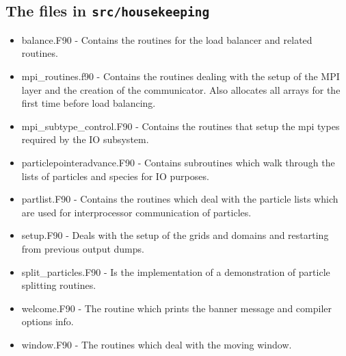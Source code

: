 \documentclass[12pt]{article}
\newcommand{\inlinecode}[1]{{\color{warwickred} \bf\texttt{#1}}}
\begin{document}
\subsection{The files in \inlinecode{src/housekeeping}}
\begin{itemize}
\item balance.F90 - Contains the routines for the load balancer and related
  routines.
\item mpi\_routines.f90 - Contains the routines dealing with the setup of the
  MPI layer and the creation of the communicator. Also allocates all arrays
  for the first time before load balancing.
\item mpi\_subtype\_control.F90 - Contains the routines that setup the mpi
  types required by the IO subsystem.
\item particlepointeradvance.F90 - Contains subroutines which walk through the
  lists of particles and species for IO purposes.
\item partlist.F90 - Contains the routines which deal with the particle lists
  which are used for interprocessor communication of particles.
\item setup.F90 - Deals with the setup of the grids and domains and restarting
  from previous output dumps.
\item split\_particles.F90 - Is the implementation of a demonstration of
  particle splitting routines.
\item welcome.F90 - The routine which prints the banner message and compiler
  options info.
\item window.F90 - The routines which deal with the moving window.
\end{itemize}
\end{document}
